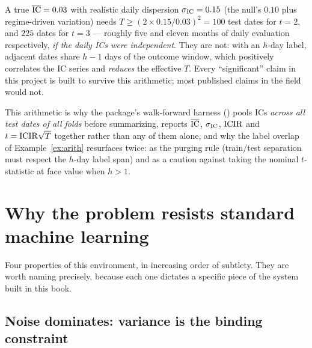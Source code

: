 \begin{example}\label{ex:arith}
A true $\overline{\mathrm{IC}} = 0.03$ with realistic daily dispersion
$\sigma_{\mathrm{IC}} = 0.15$ (the null's $0.10$ plus regime-driven variation) needs
$T \ge (2 \times 0.15/0.03)^2 = 100$ test dates for $t = 2$, and $225$ dates
for $t = 3$ --- roughly five and eleven months of daily evaluation
respectively, \emph{if the daily ICs were independent}. They are not: with an
$h$-day label, adjacent dates share $h-1$ days of the outcome window, which
positively correlates the IC series and \emph{reduces} the effective $T$.
Every ``significant'' claim in this project is built to survive this
arithmetic; most published claims in the field would not.
\end{example}

\begin{engineering}
This arithmetic is why the package's walk-forward harness
() pools ICs \emph{across all test dates of all
folds} before summarizing, reports $\overline{\mathrm{IC}}$, $\sigma_{\mathrm{IC}}$, $\mathrm{ICIR}$ and
$t = \mathrm{ICIR}\sqrt{T}$ together rather than any of them alone, and why the label
overlap of Example~\ref{ex:arith} resurfaces twice: as the purging rule
(train/test separation must respect the $h$-day label span) and as a caution
against taking the nominal $t$-statistic at face value when $h > 1$.
\end{engineering}

\section{Why the problem resists standard machine learning}\label{sec:hostile}

Four properties of this environment, in increasing order of subtlety. They
are worth naming precisely, because each one dictates a specific piece of the
system built in this book.

\subsection{Noise dominates: variance is the binding constraint}

